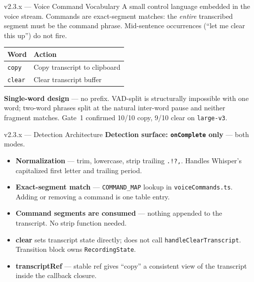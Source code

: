 \documentclass{beamer}
\begin{document}
\begin{frame}{v2.3.x --- Voice Command Vocabulary}
    \small
    A small control language embedded in the voice stream. Commands are
    exact-segment matches: the \emph{entire} transcribed segment must be the
    command phrase. Mid-sentence occurrences (``let me clear this up'')
    do not fire.

    \vspace{0.3em}
    \begin{table}
    \centering\small
    \begin{tabular}{@{} l l @{}}
        \toprule
        \textbf{Word} & \textbf{Action} \\
        \midrule
        \texttt{copy}  & Copy transcript to clipboard \\
        \texttt{clear} & Clear transcript buffer      \\
        \bottomrule
    \end{tabular}
    \end{table}

    \vspace{0.3em}
    \textbf{Single-word design} --- no prefix. VAD-split is structurally
    impossible with one word; two-word phrases split at the natural inter-word
    pause and neither fragment matches. Gate~1 confirmed 10/10 copy,
    9/10 clear on \texttt{large-v3}.
\end{frame}


\begin{frame}{v2.3.x --- Detection Architecture}
    \small
    \textbf{Detection surface: \texttt{onComplete} only} --- both modes.

    \begin{itemize}\setlength{\itemsep}{1pt}
        \item \textbf{Normalization} --- trim, lowercase, strip trailing
              \texttt{.!?,}. Handles Whisper's capitalized first letter and
              trailing period.
        \item \textbf{Exact-segment match} --- \texttt{COMMAND\_MAP} lookup in
              \texttt{voiceCommands.ts}. Adding or removing a command is one table entry.
        \item \textbf{Command segments are consumed} --- nothing appended to
              the transcript. No strip function needed.
        \item \textbf{clear} sets transcript state directly; does not call
              \texttt{handleClearTranscript}. Transition block owns
              \texttt{RecordingState}.
        \item \textbf{transcriptRef} --- stable ref gives ``copy'' a consistent
              view of the transcript inside the callback closure.
    \end{itemize}
\end{frame}
\end{document}
